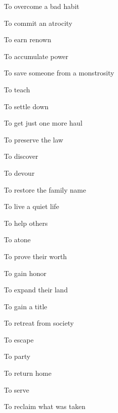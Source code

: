  
\item To overcome a bad habit

 
\item To commit an atrocity

 
\item To earn renown

 
\item To accumulate power

 
\item To save someone from a monstrosity

 
\item To teach

 
\item To settle down

 
\item To get just one more haul

 
\item To preserve the law

 
\item To discover

 
\item To devour

 
\item To restore the family name

 
\item To live a quiet life

 
\item To help others

 
\item To atone

 
\item To prove their worth

 
\item To gain honor

 
\item To expand their land

 
\item To gain a title

 
\item To retreat from society

 
\item To escape

 
\item To party

 
\item To return home

 
\item To serve

 
\item To reclaim what was taken

